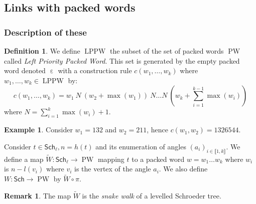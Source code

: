 \documentclass[a4paper,10pt]{amsart}
\DeclareMathOperator{\PW}{PW}
\DeclareMathOperator{\LPPW}{LPPW}
\DeclareMathOperator{\ew}{\varepsilon} %
\newcommand\Sch{\mathsf{Sch}}
\newcommand\Schl{\mathsf{Sch}_\ell}
\newcommand{\IEM}[2]{\llbracket #1,#2 \rrbracket}
\newcommand{\Schw}{Schroeder} %
\theoremstyle{definition}
\newtheorem{exam}{Example}
\newtheorem{defi}{Definition}
\newtheorem{Rq}{Remark}
\begin{document}
\subsection{Links with packed words}

\subsubsection{Description of these}

\begin{defi}
	We define $\LPPW$ the subset of  the set of packed words $\PW$ called \emph{Left Priority Packed Word}. This set is generated by the empty packed word denoted $\ew$ with a construction rule $c(w_1,\dots,w_k)$ where $w_1,\dots, w_k\in\LPPW$ by:
	\[
	c(w_1,\dots,w_k) = w_1~N~ \left(w_2 + \max(w_1)\right)~N \dots N~ \left(w_k+\sum_{i=1}^{k-1} \max(w_i)\right)
	\]
	where $N=\sum_{i=1}^{k} \max(w_i)+1$.
	
	\begin{exam}
		Consider $w_1=132$ and $w_2=211$, hence $c(w_1,w_2)=1326544$.
	\end{exam}
\end{defi}
Consider $t\in\Schl, n=h(t)$ and its enumeration of angles $(a_i)_{i\in\IEM{1}{k}}$. We define a map $\tilde{W}:\Schl \rightarrow \PW$ mapping $t$ to a packed word $w=w_1\dots w_k$ where $w_i$ is $n-l(v_i)$ where $v_i$ is the vertex of the angle $a_i.$ We also define $W:\Sch \rightarrow \PW$ by $\tilde{W}\circ \pi$.
\begin{Rq}
	The map $\tilde{W}$ is the \emph{snake walk} of a levelled \Schw{} tree.
\end{Rq}
\end{document}
